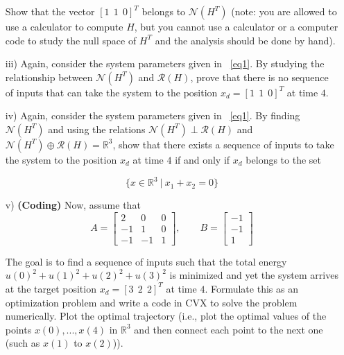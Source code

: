 \begin{homeworkProblem}
\begin{itemize}
            Show that the vector $[ 1 \ \ 1\ \ 0]^T$ belongs to 
            $\mathcal N(H^T)$ (note: you are allowed to use a calculator to 
            compute $H$, but you cannot use a calculator or a computer code 
            to study the null space of $H^T$ and the analysis should be done 
            by hand). 

        \item [iii)] Again, consider the system parameters given in
            ~\eqref{eq1}. By studying the relationship between 
            $\mathcal N(H^T)$ and $ \mathcal R(H)$, prove that there is no 
            sequence of inputs that can take the system to the position 
            $x_d=[ 1 \ \ 1\ \ 0]^T$ at time $4$.

        \item [iv)] Again, consider the system parameters given in
            ~\eqref{eq1}. By finding $\mathcal N(H^T)$ and using the relations 
            $\mathcal N(H^T) \perp \mathcal R(H)$ and $\mathcal N(H^T) \oplus 
            \mathcal R(H)= \mathbb R^3$, show that there exists a sequence of 
            inputs to  take the system to the position $x_d$ at time $4$ if 
            and only if $x_d$ belongs to the set

            \begin{equation}
                \{x\in\mathbb R^3\ | \ x_1+x_2=0\}
            \end{equation}

        \item [v)] \textbf{(Coding)} Now, assume that 
            \begin{equation}
                A= \left[ \begin{array}{ccc} 
                    2 & 0 & 0 \\ 
                    -1 & 1 & 0 \\ 
                    -1 & -1 & 1 \end{array}
                    \right], \qquad 
                B= \left[ \begin{array}{c} 
                    -1 \\ 
                    -1 \\ 
                    1 \end{array}
                    \right]
            \end{equation}

            The goal is to find a sequence of inputs such that the total energy 
            $u(0)^2 + u(1)^2 + u(2)^2 + u(3)^2$ is minimized and yet the system 
            arrives at the target position $x_d=[ 3 \ \ 2\ \ 2]^T$ at time $4$. 
            Formulate this as an optimization problem and write a code in CVX 
            to solve the problem numerically. Plot the optimal trajectory 
            (i.e., plot the optimal values of the points $x(0),...,x(4)$ in 
            $\mathbb R^3$ and then connect each point to the next one (such 
            as $x(1)$ to $x(2)$)).
        

\end{itemize}
\end{homeworkProblem}
